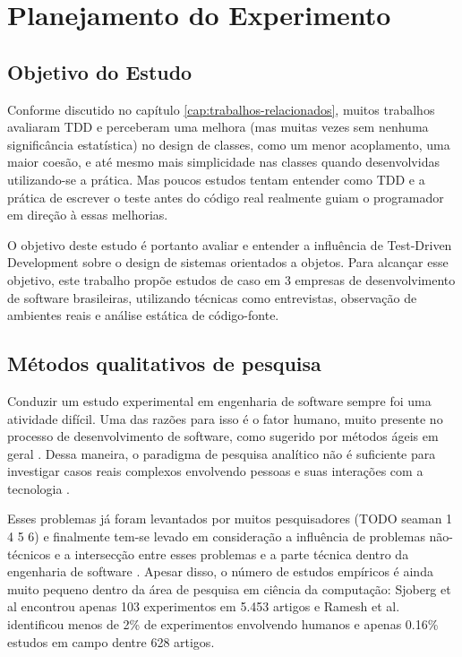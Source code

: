 \chapter{Planejamento do Experimento}
\label{cap:planejamento}

\section{Objetivo do Estudo} 
\label{sec:planejamento-proposito}

Conforme discutido no capítulo \ref{cap:trabalhos-relacionados}, muitos trabalhos avaliaram TDD e
perceberam uma melhora (mas muitas vezes sem nenhuma significância estatística) no design de classes,
como um menor acoplamento, uma maior coesão, e até mesmo mais simplicidade nas classes quando desenvolvidas
utilizando-se a prática. Mas poucos estudos tentam entender como TDD e a prática de escrever o teste antes do código real
realmente guiam o programador em direção à essas melhorias.

O objetivo deste estudo é portanto avaliar e entender a influência de Test-Driven Development sobre o design
de sistemas orientados a objetos. Para alcançar esse objetivo, 
este trabalho propõe estudos de caso em 3 empresas de desenvolvimento de software brasileiras,
utilizando técnicas como entrevistas, observação de ambientes reais e análise estática de código-fonte.

\section{Métodos qualitativos de pesquisa} 
\label{sec:planejamento-qualitativa}

Conduzir um estudo experimental em engenharia de software sempre foi uma atividade difícil. Uma das razões para isso é o
fator humano, muito presente no processo de desenvolvimento de software, como sugerido por métodos ágeis em geral \cite{AgileManifesto}. 
Dessa maneira, o paradigma de pesquisa analítico não é suficiente para investigar casos reais complexos envolvendo pessoas
e suas interações com a tecnologia \cite{guidelines-case-study}.

Esses problemas já foram levantados por muitos pesquisadores (TODO seaman 1 4 5 6) e finalmente tem-se 
levado em consideração a influência de problemas não-técnicos e a intersecção entre esses problemas e a parte técnica 
dentro da engenharia de software \cite{seaman}.
Apesar disso, o número de estudos empíricos é ainda muito pequeno dentro da área de pesquisa em ciência da computação: 
Sjoberg et al \cite{sjoberg} encontrou apenas 103 experimentos em 5.453 artigos e Ramesh et al. \cite{ramesh} 
identificou menos de 2\% de experimentos envolvendo humanos e apenas 0.16\% estudos em campo dentre 628 artigos.

